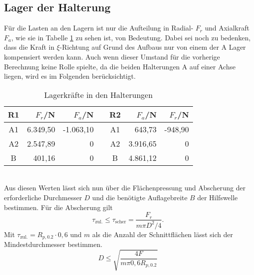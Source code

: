 \subsection{Lager der Halterung}
Für die Lasten an den Lagern ist nur die Aufteilung in Radial- $F_r$ und Axialkraft $F_a$, wie sie in Tabelle \ref{tab_lagerkraefte} zu sehen ist, von Bedeutung. Dabei sei noch zu bedenken, dass die Kraft in $\xi$-Richtung auf Grund des Aufbaus nur von einem der A Lager kompensiert werden kann. Auch wenn dieser Umstand für die vorherige Berechnung keine Rolle spielte, da die beiden Halterungen A auf einer Achse liegen, wird es im Folgenden berücksichtigt.
\begin{table}[h] 
	\centering 
	\caption{Lagerkräfte in den Halterungen}
	\label{tab_lagerkraefte}
	\begin{tabular}{c|r|rc||c|r|r} 
		\textbf{R1}&$F_{r}$/N&$F_a$/N&&\textbf{R2}&$F_{a}$/N&$F_r$/N\\ 
		\hline 
		A1& 6.349,50&-1.063,10&&A1&643,73&-948,90\\
		A2&2.547,89&0&&A2&3.916,65&0\\
		B&401,16&0&&B&4.861,12&0\\
	\end{tabular}
\end{table} \\
Aus diesen Werten lässt sich nun über die Flächenpressung und Abscherung der erforderliche Durchmesser $D$ und die benötigte Auflagebreite $B$ der Hilfswelle bestimmen. Für die Abscherung gilt
\begin{equation}
	\tau_{\mathrm{zul.}}\leq\tau_\mathrm{scher}=\frac{F_r}{m\pi D^2/4}.
\end{equation}
Mit $\tau_{\mathrm{zul.}}=R_{p, 0.2}\cdot 0,6$ \cite{metall} und $m$ als die Anzahl der Schnittflächen lässt sich der Mindestdurchmesser bestimmen.
\begin{equation}
	D \leq \sqrt{\frac{4F}{m\pi 0,6 R_{p, 0.2}}}
\end{equation}
